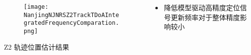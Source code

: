 \begin{frame}
\begin{columns}[t]
\begin{column}{0.5\textwidth}
\begin{columns}[t]
\begin{column}{0.33\textwidth}
					   	\begin{figure}
					   	\centering
					   	    \texttt{[image: NanjingNJNRSZ2TrackTDoAIntegratedFrequencyComparation.png]}
					   	\end{figure}
					   	\vspace{-0.5cm}
		   			   	\hspace{0.0cm} {\tiny Z2 轨迹位置估计结果}
					\end{column}
					\begin{column}{0.33\textwidth}
					    \vspace{1cm}
						{\small 						
							\begin{itemize}
								\item 降低模型驱动高精度定位信号更新频率对于整体精度影响较小
							\end{itemize}
						}
					\end{column}
				\end{columns}
		\end{column}
	\end{columns}
\end{frame}

